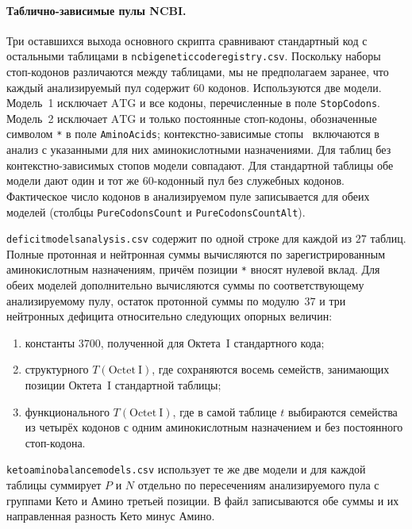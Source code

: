 \documentclass[11pt,a4paper]{article}
\renewcommand{\_}{\origunderscore\allowbreak}
\begin{document}
\paragraph{Таблично-зависимые пулы NCBI.}
Три оставшихся выхода основного скрипта сравнивают стандартный код
с остальными таблицами в
\texttt{ncbi\_genetic\_code\_registry.csv}. Поскольку
наборы стоп-кодонов различаются между таблицами, мы не предполагаем
заранее, что каждый анализируемый пул содержит $60$ кодонов.
Используются две модели. Модель~1 исключает
$\mathrm{ATG}$ и все кодоны, перечисленные в поле
\texttt{Stop\_Codons}. Модель~2 исключает $\mathrm{ATG}$ и только
постоянные стоп-кодоны, обозначенные символом \texttt{*} в поле
\texttt{Amino\_Acids}; контекстно-зависимые стопы~\cite{swart2016,heaphy2016,zahonova2016} включаются в анализ
с указанными для них аминокислотными назначениями. Для таблиц без
контекстно-зависимых стопов модели совпадают. Для стандартной
таблицы обе модели дают один и тот же 60-кодонный пул без служебных
кодонов. Фактическое число кодонов в
анализируемом пуле записывается для обеих моделей (столбцы
\texttt{Pure\_Codons\_Count} и \texttt{Pure\_Codons\_Count\_Alt}).

\texttt{deficit\_models\_analysis.csv} содержит по одной строке для
каждой из $27$ таблиц. Полные протонная и нейтронная суммы вычисляются
по зарегистрированным аминокислотным
назначениям, причём позиции \texttt{*} вносят нулевой вклад. Для
обеих моделей дополнительно вычисляются суммы по
соответствующему анализируемому пулу, остаток протонной суммы по
модулю~$37$ и три нейтронных дефицита относительно следующих
опорных величин:
\begin{enumerate}
  \item константы $3700$, полученной для Октета~I стандартного кода;
  \item структурного $T(\mathrm{Octet~I})$, где сохраняются восемь
        семейств, занимающих позиции Октета~I стандартной таблицы;
  \item функционального $T(\mathrm{Octet~I})$, где в самой таблице
        $t$ выбираются семейства из четырёх кодонов с одним
        аминокислотным назначением и без постоянного стоп-кодона.
\end{enumerate}

\texttt{keto\_amino\_balance\_models.csv} использует те же две
модели и для каждой таблицы суммирует $P$ и $N$ отдельно по
пересечениям анализируемого пула с группами Кето и Амино третьей
позиции. В файл записываются обе суммы и их направленная разность
Кето минус Амино.
\end{document}
